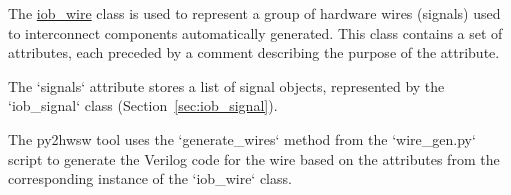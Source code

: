 %

%
%

The \href{https://github.com/IObundle/py2hwsw/blob/main/py2hwsw/scripts/iob_wire.py}{iob\_wire} class is used to represent a group of hardware wires (signals) used to interconnect components automatically generated.
This class contains a set of attributes, each preceded by a comment describing the purpose of the attribute.


The `signals` attribute stores a list of signal objects, represented by the `iob\_signal` class (Section~\ref{sec:iob_signal}).

%
%

The py2hwsw tool uses the `generate\_wires` method from the `wire\_gen.py` script to generate the Verilog code for the wire based on the attributes from the corresponding instance of the `iob\_wire` class.

